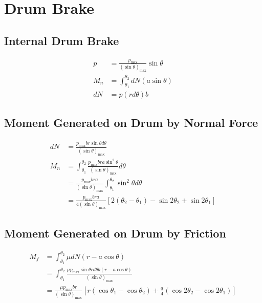 \documentclass[
10pt,
a4paper,
openany,
svgnames,
]{book}
\begin{document}
\begin{center}
\end{center}

\section*{Drum Brake}
\label{sec:org7ad1aca}

\subsection*{Internal Drum Brake}
\label{sec:org6bb5275}

\begin{center}
\end{center}
\begin{align*}
    p &= \frac{p_{\max}}{(\sin \theta)_{\max}} \sin \theta \\
    M_n &= \int_{\theta_1}^{\theta_2} dN (a \sin \theta) \\
    dN &= p (r d\theta) b
\end{align*}

\subsection*{Moment Generated on Drum by Normal Force}
\label{sec:orgd4cd97c}

\begin{align*}
    dN &= \frac{p_{\max} br \sin \theta d\theta}{(\sin \theta)_{\max}} \\
    M_n &= \int_{\theta_1}^{\theta_2} \frac{p_{\max} bra \sin^2 \theta}{(\sin \theta)_{\max}} d\theta \\
        &= \frac{p_{\max} bra}{(\sin \theta)_{\max}} \int_{\theta_1}^{\theta_2} \sin^2 \theta d\theta \\
        &= \frac{p_{\max} bra}{4(\sin \theta)_{\max}} [2(\theta_2 - \theta_1) - \sin 2\theta_2 + \sin 2\theta_1]
\end{align*}

\subsection*{Moment Generated on Drum by Friction}
\label{sec:orgd4aa9ce}

\begin{align*}
    M_f &= \int_{\theta_1}^{\theta_2} \mu dN (r - a \cos \theta) \\
        &= \int_{\theta_1}^{\theta_2} \frac{\mu p_{\max} \sin \theta r d\theta b (r - a \cos \theta)}{(\sin \theta)_{\max}} \\
        &= \frac{\mu p_{\max} br}{(\sin \theta)_{\max}} \left[ r( \cos \theta_1 - \cos \theta_2) + \frac{a}{4}(\cos 2\theta_2 - \cos 2\theta_1) \right]
\end{align*}
\end{document}
